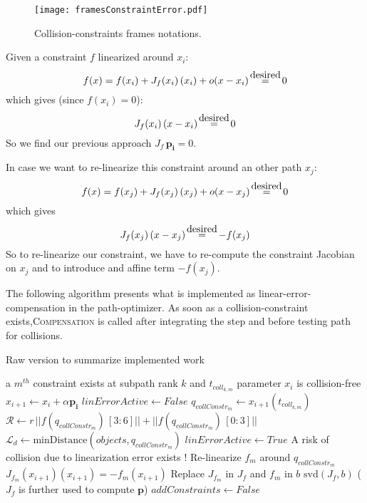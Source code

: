 \documentclass {article}
\newcommand\p{\mathbf{p_i}}
\newcommand\myeq{\stackrel{\mathclap{\normalfont\mbox{desired}}}{=}}
\begin{document}
\begin{figure}[h]
	\centering
	\texttt{[image: framesConstraintError.pdf]}
	\caption{Collision-constraints frames notations.}
	\label{fig:framesConstraintError}
\end{figure}

\vspace{0.2cm}

Given a constraint $f$ linearized around $x_i$:
$$ f(x) = f(x_i) + J_f(x_i)\,(x_i) + o(x-x_i) \ \ \ \myeq  \ \ \ 0 $$
which gives (since $f(x_i)=0$):
$$ J_f(x_i)\,(x-x_i) \ \ \ \myeq  \ \ \ 0 $$
So we find our previous approach $ J_f\,\p = 0$.

\vspace{0.2cm}

In case we want to re-linearize this constraint around an other path $x_j$:
$$ f(x) = f(x_j) + J_f(x_j)\,(x_j) + o(x-x_j) \ \ \ \myeq  \ \ \ 0 $$
which gives
$$ J_f(x_j)\,(x-x_j) \ \ \ \myeq  \ \ \ -f(x_j) $$
So to re-linearize our constraint, we have to re-compute the constraint Jacobian on $x_j$ and to introduce and affine term $-f(x_j)$.


\vspace{0.2cm}

The following algorithm presents what is implemented as linear-error-compensation in the path-optimizer. As soon as a collision-constraint exists,\textsc{Compensation} is called after integrating the step and before testing path for collisions.

\begin{algorithm}
\caption{Raw version to summarize implemented work}
\label{algo:affineCompensation}
\begin{algorithmic}[1] %
   \State a $m^{th}$ constraint exists at subpath rank $k$ and $t{_{coll_{k,m}}}$ parameter
   \State $x_i$ is collision-free
   \State $x_{i+1} \gets x_i + \alpha \p$
   \State $linErrorActive \gets False$
   		\State $q_{collConstr_m} \gets x_{i+1}(t{_{coll_{k,m}}})$
   		\State $\mathscr{R} \gets r \, ||f(q_{collConstr_m})\,[3:6]|| + ||f(q_{collConstr_m})\,[0:3]||$
   		\State $\mathscr{L}_d \gets \text{minDistance}(objects, q_{collConstr_m})$
   			\State $linErrorActive \gets True$
   			\State A risk of collision due to linearization error exists !
   			\State Re-linearize $f_m$ around $q_{collConstr_m}$
   			\State $J_{f_m}(x_{i+1})(x_{i+1}) = -f_m(x_{i+1})$
   			\State Replace $J_{f_m}$ in $J_f$ and $f_m$ in $b$
   		\EndIf
   \EndFor
   		\State $\text{svd}(J_f,b)$
   		\State ($J_f$ is further used to compute $\mathbf{p}$)
   		\State $addConstraints \gets False$
   \EndIf
\EndProcedure
\end{algorithmic}
\end{algorithm}
\end{document}
